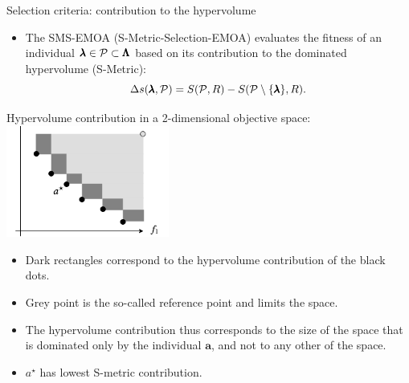 \begin{frame}[allowframebreaks]{Selection criteria: contribution to the hypervolume}

\begin{itemize}
\item The SMS-EMOA (S-Metric-Selection-EMOA) evaluates the fitness of an individual $\pmb{\lambda} \in \mathcal{P} \subset \pmb{\Lambda}$ based on its contribution to the dominated hypervolume (S-Metric):
$$
\Delta s(\pmb{\lambda}, \mathcal{P}) = S(\mathcal{P}, R) - S(\mathcal{P} \setminus \{ \pmb{\lambda}\}, R).
$$
\end{itemize}



\framebreak

\begin{center}
Hypervolume contribution in a 2-dimensional objective space:\\
\includegraphics[width = 0.4\textwidth]{images/hypervolumenbeitrag.png}
\end{center}

\vspace*{-0.5cm}
\begin{itemize}
\item Dark rectangles correspond to the hypervolume contribution of the black dots.
\item Grey point is the so-called reference point and limits the space.
\item The hypervolume contribution thus corresponds to the size of the space that is dominated only by the individual $\bm{a}$, and not to any other of the space.
\item $a^\star$ has lowest S-metric contribution.
\end{itemize}
\end{frame}

